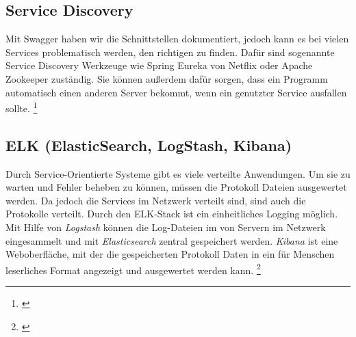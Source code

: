 \subsection{Service Discovery}
\label{subsec:ServiceDiscovery}
Mit Swagger haben wir die Schnittstellen dokumentiert, jedoch kann es bei vielen Services problematisch werden, den richtigen zu finden. Dafür sind sogenannte Service Discovery Werkzeuge wie Spring Eureka von Netflix oder Apache Zookeeper zuständig. Sie können außerdem dafür sorgen, dass ein Programm automatisch einen anderen Server bekommt, wenn ein genutzter Service ausfallen sollte. \footnote{\cite[vgl. S. 326 ff.]{EWolff2016:Microservices}}

\subsection{ELK (ElasticSearch, LogStash, Kibana)}
\label{subsec:elk}
Durch Service-Orientierte Systeme gibt es viele verteilte Anwendungen. Um sie zu warten und Fehler beheben zu können, müssen die Protokoll Dateien ausgewertet werden. Da jedoch die Services im Netzwerk verteilt sind, sind auch die Protokolle verteilt. Durch den ELK-Stack ist ein einheitliches Logging möglich.
Mit Hilfe von \textit{Logstash} können die Log-Dateien im von Servern im Netzwerk eingesammelt und mit \textit{Elasticsearch} zentral gespeichert werden. \textit{Kibana} ist eine Weboberfläche, mit der die gespeicherten Protokoll Daten in ein für Menschen leserliches Format angezeigt und ausgewertet werden kann.
\footnote{\cite[vgl. S. 244 ff.]{EWolff2016:Microservices}}